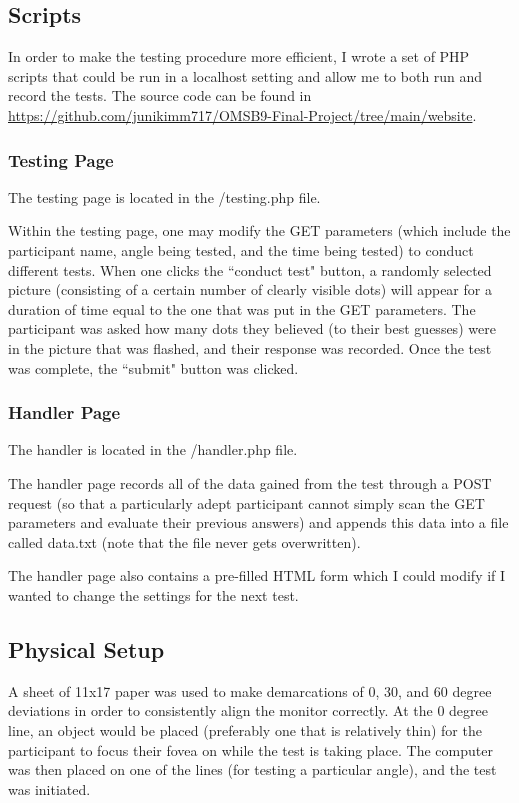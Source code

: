 \documentclass[12pt]{article}
\begin{document}
\subsection{Scripts}

In order to make the testing procedure more efficient, I wrote a set of PHP
scripts that could be run in a localhost setting and allow me to both run and record the
tests. The source code can be found in
\url{https://github.com/junikimm717/OMSB9-Final-Project/tree/main/website}.

\subsubsection{Testing Page}
The testing page is located in the /testing.php file.

Within the testing page, one may modify the GET parameters (which include the
participant name, angle being tested, and the time being tested) to
conduct different tests. When one clicks the ``conduct test" button, a randomly
selected picture (consisting of a certain number of clearly visible dots) will
appear for a duration of time equal to the one that was put in the GET
parameters. The participant was asked how many dots they believed (to their
best guesses) were in the picture that was flashed, and their response
was recorded. Once the test was complete, the ``submit" button was clicked.

\subsubsection{Handler Page}
The handler is located in the /handler.php file.

The handler page records all of the data gained from the test through a POST
request (so that a particularly adept participant cannot simply scan the GET
parameters and evaluate their previous answers) and appends this data
into a file called data.txt (note that the file never gets overwritten).

The handler page also contains a pre-filled HTML form which I could
modify if I wanted to change the settings for the next test.

\subsection{Physical Setup}
A sheet of 11x17 paper was used to make demarcations of 0, 30, and 60 degree
deviations in order to consistently align the monitor correctly. At the 0
degree line, an object would be placed (preferably one that is relatively thin)
for the participant to focus their fovea on while the test is taking place.
The computer was then placed on one of the lines (for testing a particular
angle), and the test was initiated.
\end{document}
